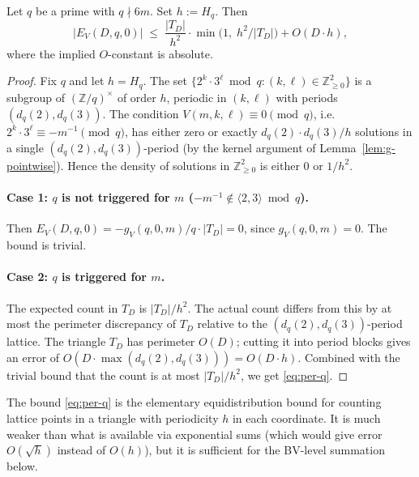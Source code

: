 \begin{lemma}\label{lem:per-q}
Let $q$ be a prime with $q \nmid 6m$. Set $h := H_{q}$. Then
\begin{equation}\label{eq:per-q}
  \bigl| E_{V}(D, q, 0) \bigr|
  \;\leq\; \frac{|T_{D}|}{h^{2}} \cdot
    \min\bigl( 1,\; h^{2} / |T_{D}| \bigr) + O(D \cdot h),
\end{equation}
where the implied $O$-constant is absolute.
\end{lemma}

\begin{proof}
Fix $q$ and let $h = H_{q}$. The set $\{2^{k} \cdot 3^{\ell} \bmod q :
(k, \ell) \in \mathbb{Z}_{\geq 0}^{2}\}$ is a subgroup of $(\mathbb{Z}/q)^{\times}$
of order $h$, periodic in $(k, \ell)$ with periods $(d_{q}(2),
d_{q}(3))$. The condition $V(m, k, \ell) \equiv 0 \pmod{q}$, i.e.\ $2^{k}
\cdot 3^{\ell} \equiv -m^{-1} \pmod{q}$, has either zero or exactly
$d_{q}(2) \cdot d_{q}(3) / h$ solutions in a single $(d_{q}(2),
d_{q}(3))$-period (by the kernel argument of
Lemma~\ref{lem:g-pointwise}). Hence the density of solutions in
$\mathbb{Z}_{\geq 0}^{2}$ is either $0$ or $1/h^{2}$.

\paragraph{Case 1: $q$ is not triggered for $m$
($-m^{-1} \notin \langle 2, 3\rangle \bmod q$).} Then $E_{V}(D, q, 0)
= -g_{V}(q, 0, m)/q \cdot |T_{D}| = 0$, since $g_{V}(q, 0, m) = 0$.
The bound is trivial.

\paragraph{Case 2: $q$ is triggered for $m$.} The expected count in
$T_{D}$ is $|T_{D}| / h^{2}$. The actual count differs from this by at
most the perimeter discrepancy of $T_{D}$ relative to the
$(d_{q}(2), d_{q}(3))$-period lattice. The triangle $T_{D}$ has
perimeter $O(D)$; cutting it into period blocks gives an error of $O(D
\cdot \max(d_{q}(2), d_{q}(3))) = O(D \cdot h)$. Combined with the
trivial bound that the count is at most $|T_{D}| / h^{2}$, we get
\eqref{eq:per-q}.
\end{proof}

\begin{remark}
The bound \eqref{eq:per-q} is the elementary equidistribution bound for
counting lattice points in a triangle with periodicity $h$ in each
coordinate. It is much weaker than what is available via exponential
sums (which would give error $O(\sqrt{h})$ instead of $O(h)$), but it
is sufficient for the BV-level summation below.
\end{remark}

